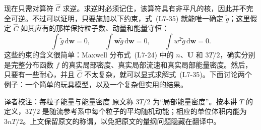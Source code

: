 现在只需对算符 $\widehat{\mathcal C}$ 求逆。求逆时必须记住，该算符具有非平凡的核，因此并不完全可逆。不过可以证明，只要施加以下约束，式~(L7-35) 就能唯一确定 $\widetilde g$；这里假定 $\widehat C$ 如其应有的那样保持粒子数、动量和能量守恒：
\begin{equation}
\int\widetilde g\,\mathrm d\boldsymbol w=0,\qquad
\int\boldsymbol w\widetilde g\,\mathrm d\boldsymbol w=0,\qquad
\int w^2\widetilde g\,\mathrm d\boldsymbol w=0.
\tag{L7-36}\label{eq:L7:36}
\end{equation}
这些约束的含义很简单：Maxwell 分布式~(L7-24) 中的 $n$、$\boldsymbol U$ 和 $3T/2$，确实分别是完整分布函数 $f$ 的真实局部密度、真实局部流速和真实局部能量密度。然后，只要有一些耐心，并且 $\widehat C$ 不太复杂，就可以显式求解式~(L7-35)。下面讨论两个例子：一个简单的玩具模型，以及一个复杂但实用的结果。
\begin{correction}{译者校注：每粒子能量与能量密度}
原文称 $3T/2$ 为“局部能量密度”。按本讲 $T$ 的定义，$3T/2$ 是随流参考系中每个粒子的平均随机动能；相应的单位体积内能为 $3nT/2$。上文保留原文的称谓，以免把原文的量纲问题隐藏在翻译中。
\end{correction}

